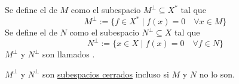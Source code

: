 \begin{definicion}
    Se define el  de $M$ como el subespacio $M^{\perp} \subseteq X^*$ tal que
    \begin{equation*}
        M^{\perp} := \{ f \in X^* \mid f(x) = 0 \quad \forall x \in M \}
    \end{equation*}
    Se define el  de $N$ como el subespacio $N^{\perp} \subseteq X$ tal que
    \begin{equation*}        
        N^{\perp} := \{ x \in X \mid f(x) = 0 \quad \forall f \in N \}
    \end{equation*}
    $M^{\perp}$ y $N^{\perp}$ son llamados .
\end{definicion}

\begin{observacion}
    $M^{\perp}$ y $N^{\perp}$ son \underline{subespacios cerrados} incluso si $M$ y $N$ no lo son.
\end{observacion}


